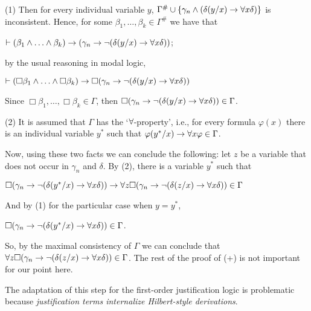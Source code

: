 \qquad (1) Then for every individual variable $y$,  $\Gamma^{\#} \cup \{ \gamma_{n} \wedge (\delta(y/ x) \rightarrow \forall x \delta) \}$ is inconsistent. Hence, for some $\beta_{1}, \dots, \beta_{k} \in \Gamma^{\#}$ we have that

\begin{center}
	$\teo (\beta_{1} \e \dots \e \beta_{k}) \impli( \gamma_{n} \impli \nao (\delta(y/ x) \impli \todo x \delta))$;
\end{center}
by the usual reasoning in modal logic,


\begin{center}
	$\teo (\Box\beta_{1} \e \dots \e \Box\beta_{k}) \impli\Box( \gamma_{n} \impli \nao (\delta(y/ x) \impli \todo x \delta))$
\end{center}

\qquad Since $\Box\beta_{1}, \dots, \Box\beta_{k} \in \Gamma$, then $\Box( \gamma_{n} \rightarrow \neg (\delta(y/ x) \rightarrow \forall x \delta)) \in \Gamma$.

\qquad (2) It is assumed that $\Gamma$ has the `$\forall$-property', i.e., for every formula $\varphi (x)$ there is an individual variable $y^{*}$ such that   $\varphi(y^{*}/ x) \rightarrow \forall x \varphi \in \Gamma$.

\qquad Now, using these two facts we can conclude the following: let $z$ be a variable that does not occur in $\gamma_{n}$ and $\delta$. By (2), there is a variable $y^{*}$ such that

\begin{center}
	$\Box(\gamma_{n} \rightarrow \neg (\delta(y^{*}/ x) \rightarrow \forall x \delta)) \rightarrow \forall z \Box(\gamma_{n} \rightarrow \neg (\delta(z/ x) \rightarrow \forall x \delta)) \in \Gamma$
\end{center}

\qquad And by (1) for the particular case when $y = y^{*}$,


\begin{center}
	$\Box( \gamma_{n} \rightarrow \neg (\delta(y^{*}/ x) \rightarrow \forall x \delta)) \in \Gamma$.
\end{center}

\qquad So, by the maximal consistency of $\Gamma$ we can conclude that $\forall z \Box(\gamma_{n} \rightarrow \neg (\delta(z/ x) \rightarrow \forall x \delta)) \in \Gamma$. The rest of the proof of (+) is not important for our point here.

\qquad The adaptation of this step for the first-order justification logic is problematic because \textit{justification terms internalize Hilbert-style derivations}.

